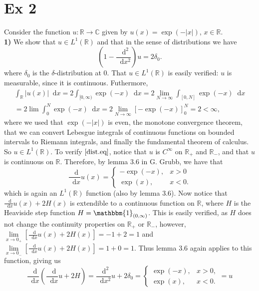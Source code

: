 \documentclass[a4paper,11pt]{article}
\newcommand{\abs}[1]{\left\lvert #1 \right\rvert}
\newcommand*\diff{\mathop{}\!\mathrm{d}}
\newcommand{\R}{\mathbb{R}}
\newcommand{\C}{\mathbb{C}}
\numberwithin{equation}{section}
\begin{document}
\section*{Ex 2}
\setcounter{section}{2}
Consider the function $ u:\R\to\C $ given by $ u(x)=\exp(-\abs{x}) $, $ x\in\R $.\\
\textbf{1)} We show that $ u\in L^1(\R) $ and that in the sense of distributions we have \begin{equation}\label{dist.eq}
\left(1-\frac{\diff^2}{\diff x^2}\right)u=2\delta_0.
\end{equation}
where $ \delta_0 $ is the $ \delta $-distribution at $ 0 $.
That $ u\in L^1(\R) $ is easily verified: $ u $ is measurable, since it is continuous. Futhermore, \begin{equation}
\begin{aligned}
\int_\R \abs{u(x)}\diff x=2\int_{[0,\infty)}\exp(-x)\diff x=2\lim\limits_{N\to\infty}\int_{[0,N]}\exp(-x)\diff x\\
=2\lim\int_{0}^{N}\exp(-x)\diff x=2\lim\limits_{N\to\infty}\left[-\exp(-x)\right]_0^N=2<\infty,
\end{aligned}
\end{equation}
where we used that $ \exp(-\abs{x}) $ is even, the monotone convergence theorem, that we can convert Lebesgue integrals of continuous functions on bounded intervals to Riemann integrals, and finally the fundamental theorem of calculus. So $ u\in L^1(\R) $. To verify $ \eqref{dist.eq} $, notice that $ u $ is $ C^\infty $ on $ \R_+ $ and $ \R_- $, and that $ u $ is continuous on $ \R $. Therefore, by lemma 3.6 in G. Grubb, we have that \begin{equation}
 \frac{\diff}{\diff x}u(x)=\begin{cases}
 -\exp(-x),&x>0\\
 \exp(x),&x<0.
 \end{cases}
\end{equation}
which is again an $ L^1(\R) $ function (also by lemma 3.6). Now notice that $ \frac{\diff}{\diff x}u(x)+2H(x) $ is extendible to a continuous function on $ \R $, where $ H $ is the Heaviside step function $ H=\mathbbm{1}_{(0,\infty)} $.
This is easily verified, as $ H $ does not change the continuity properties on $ \R_+ $ or $ \R_- $, however, $ \lim\limits_{x\to0_+}\left[\frac{\diff}{\diff x}u(x)+2H(x)\right]=-1+2=1 $ and $ \lim\limits_{x\to0_-}\left[\frac{\diff}{\diff x}u(x)+2H(x)\right]=1+0=1 $. Thus lemma 3.6 again applies to this function, giving us\begin{equation}
\frac{\diff}{\diff x}\left(\frac{\diff}{\diff x}u+2H\right)=\frac{\diff^2}{\diff x^2}u+2\delta_0=\begin{cases}
\exp(-x),&x>0,\\
\exp(x),&x<0.
\end{cases}=u
\end{equation}
\end{document}

